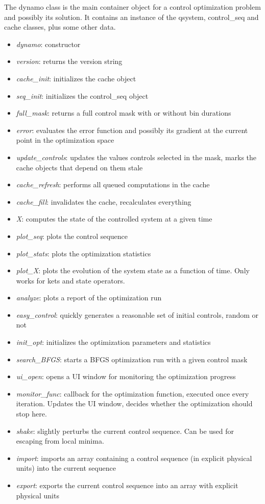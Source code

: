 \documentclass[aps, pra, a4paper, longbibliography, superscriptaddress]{revtex4-1}
\begin{document}
The dynamo class is the main container object for a control optimization problem and possibly its solution.
It contains an instance of the qsystem, control\_seq and cache classes, plus some other data.
\begin{itemize}
\item
\emph{dynamo}: constructor
\item
\emph{version}: returns the version string
\item
\emph{cache\_init}: initializes the cache object
\item
\emph{seq\_init}: initializes the control\_seq object
\item
\emph{full\_mask}: returns a full control mask with or without bin durations
\item
\emph{error}: evaluates the error function and possibly its gradient
at the current point in the optimization space
\item
\emph{update\_controls}: updates the values controls selected in the
mask, marks the cache objects that depend on them stale
\item
\emph{cache\_refresh}: performs all queued computations in the cache
\item
\emph{cache\_fill}: invalidates the cache, recalculates everything
\item
\emph{X}: computes the state of the controlled system at a given time
\item
\emph{plot\_seq}: plots the control sequence
\item
\emph{plot\_stats}: plots the optimization statistics
\item
\emph{plot\_X}: plots the evolution of the system state as a function
of time. Only works for kets and state operators.
\item
\emph{analyze}: plots a report of the optimization run
\item
\emph{easy\_control}: quickly generates a reasonable set of initial
controls, random or not
\item
\emph{init\_opt}: initializes the optimization parameters and statistics
\item
\emph{search\_BFGS}: starts a BFGS optimization run with a given control mask
\item
\emph{ui\_open}: opens a UI window for monitoring the optimization progress
\item
\emph{monitor\_func}: callback for the optimization function, executed
once every iteration. Updates the UI window, decides whether the
optimization should stop here.
\item
\emph{shake}: slightly perturbs the current control sequence. Can be
used for escaping from local minima.
\item
\emph{import}: imports an array containing a control sequence (in
explicit physical units) into the current sequence
\item
\emph{export}: exports the current control sequence into an array with
explicit physical units
\end{itemize}
\end{document}
